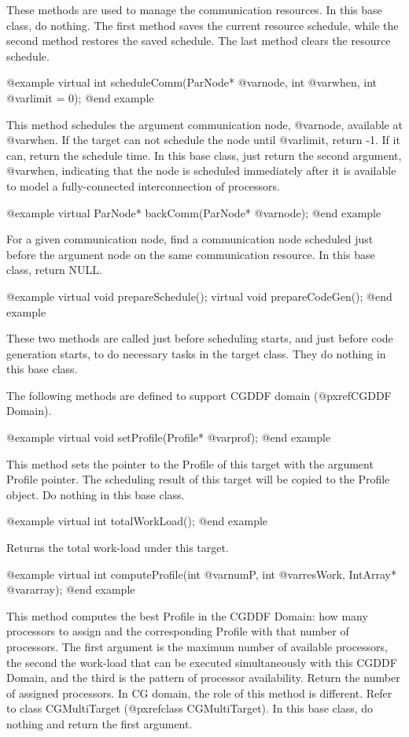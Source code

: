 These methods are used to manage the communication resources. In this base
class, do nothing. The first method saves the current resource schedule,
while the second method restores the saved schedule. The last method clears
the resource schedule.

@example
virtual int scheduleComm(ParNode* @var{node}, int @var{when}, int @var{limit} = 0);
@end example

This method schedules the argument communication node, @var{node}, available
at @var{when}. If the target can not schedule the node until @var{limit},
return -1. If it can, return the schedule time. In this base class, just return
the second argument, @var{when}, indicating that the node is scheduled
immediately after it is available to model a fully-connected interconnection of
processors.

@example
virtual ParNode* backComm(ParNode* @var{node});
@end example

For a given communication node, find a communication node scheduled just before
the argument node on the same communication resource. In this base class,
return NULL.

@example
virtual void prepareSchedule();
virtual void prepareCodeGen();
@end example

These two methods are called just before scheduling starts, and just
before code generation starts, to do necessary tasks in the target class.
They do nothing in this base class.

The following methods are defined to support CGDDF domain 
(@pxref{CGDDF Domain}).

@example
virtual void setProfile(Profile* @var{prof});
@end example

This method sets the pointer to the Profile of this target with the argument
Profile pointer. The scheduling result of this target will be copied to the
Profile object. Do nothing in this base class.

@example
virtual int totalWorkLoad();
@end example

Returns the total work-load under this target.

@example
virtual int computeProfile(int @var{numP}, int @var{resWork}, IntArray* @var{array});
@end example

This method computes the best Profile in the CGDDF Domain: how many 
processors to assign and the corresponding Profile with that number 
of processors. The first argument is the maximum number of available 
processors, the second the work-load that can be executed simultaneously 
with this CGDDF Domain, and the third is the pattern of processor availability.
Return the number of assigned processors.
In CG domain, the role of this method is different. Refer to class
CGMultiTarget (@pxref{class CGMultiTarget}). In this base class, do nothing 
and return the first argument. 

